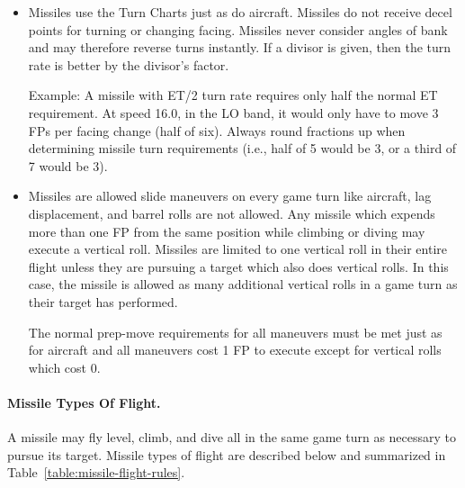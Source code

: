 {\begin{itemize}
\begin{itemize}
        \item {}

    \end{itemize}

    \item {} Missiles use the Turn Charts just as do aircraft. Missiles do not receive decel points for turning or changing facing. Missiles never consider angles of bank and may therefore reverse turns instantly. If a divisor is given, then the turn rate is better by the divisor's factor.

    Example: A missile with ET/2 turn rate requires only half the normal ET requirement. At speed 16.0, in the LO band, it would only have to move 3 FPs per facing change (half of six). Always round fractions up when determining missile turn requirements (i.e., half of 5 would be 3, or a third of 7 would be 3).

    \item {} Missiles are allowed slide maneuvers on every game turn like aircraft, lag displacement, and barrel rolls are not allowed. Any missile which expends more than one FP from the same position while climbing or diving may execute a vertical roll. Missiles are limited to one vertical roll in their entire flight unless they are pursuing a target which also does vertical rolls. In this case, the missile is allowed as many additional vertical rolls in a game turn as their target has performed.

    The normal prep-move requirements for all maneuvers must be met just as for aircraft and all maneuvers cost 1 FP to execute except for vertical rolls which cost 0. 

\end{itemize}
}{
\paragraph{Missile Types Of Flight.} A missile may fly level, climb, and dive all in the same game turn as necessary to pursue its target. Missile types of flight are described below and summarized in Table~\ref{table:missile-flight-rules}.

}
